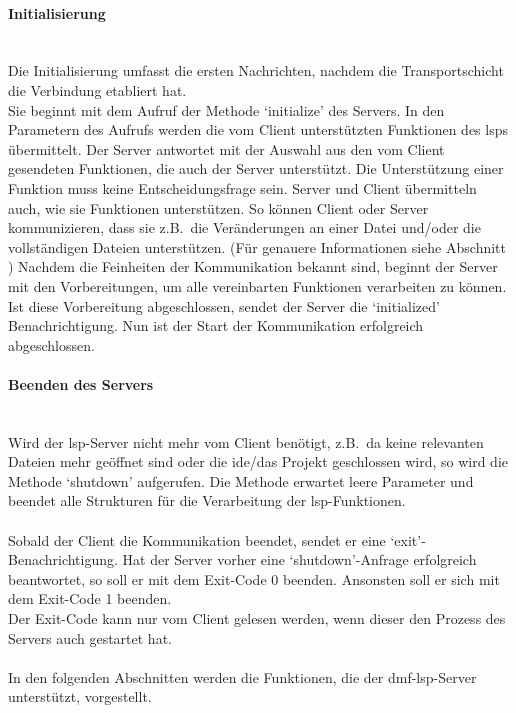 \documentclass[./einleitung.tex]{subfiles}
\begin{document}
    \paragraph{Initialisierung}\mbox{}\\
    Die Initialisierung umfasst die ersten Nachrichten, nachdem die Transportschicht die Verbindung etabliert hat. \\
    Sie beginnt mit dem Aufruf der Methode `initialize' des Servers.
    In den Parametern des Aufrufs werden die vom Client unterstützten Funktionen des \acrshort{lsp}s übermittelt.
    Der Server antwortet mit der Auswahl aus den vom Client gesendeten Funktionen, die auch der Server unterstützt.
    Die Unterstützung einer Funktion muss keine Entscheidungsfrage sein.
    Server und Client übermitteln auch, wie sie Funktionen unterstützen.
    So können Client oder Server kommunizieren, dass sie z.B.\ die Veränderungen an einer Datei und/oder die vollständigen Dateien unterstützen.
    (Für genauere Informationen siehe Abschnitt )
    \newline
    \newline
    Nachdem die Feinheiten der Kommunikation bekannt sind, beginnt der Server mit den Vorbereitungen, um alle vereinbarten Funktionen verarbeiten zu können.
    Ist diese Vorbereitung abgeschlossen, sendet der Server die `initialized' Benachrichtigung.
    Nun ist der Start der Kommunikation erfolgreich abgeschlossen.


    \paragraph{Beenden des Servers}\mbox{}\\
    Wird der \acrshort{lsp}-Server nicht mehr vom Client benötigt, z.B.\ da keine relevanten Dateien mehr geöffnet sind oder die \acrshort{ide}/das Projekt geschlossen wird, so wird die Methode `shutdown' aufgerufen.
    Die Methode erwartet leere Parameter und beendet alle Strukturen für die Verarbeitung der \acrshort{lsp}-Funktionen.
    \\\\
    Sobald der Client die Kommunikation beendet, sendet er eine `exit'-Benachrichtigung.
    Hat der Server vorher eine `shutdown'-Anfrage erfolgreich beantwortet, so soll er mit dem Exit-Code 0 beenden.
    Ansonsten soll er sich mit dem Exit-Code 1 beenden.\\
    Der Exit-Code kann nur vom Client gelesen werden, wenn dieser den Prozess des Servers auch gestartet hat.
    \\\\
    In den folgenden Abschnitten werden die Funktionen, die der \acrshort{dmf}-\acrshort{lsp}-Server unterstützt, vorgestellt.
\end{document}
